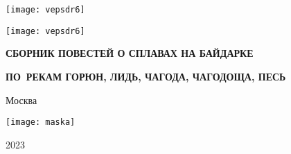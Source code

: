 \begin{titlepage}
	\newpage
	\begin{center}
		\Large \textbf \MyVarAuthorName
	\end{center}	
	\vspace{0.75cm}	
	\begin{center}
	\texttt{[image: vepsdr6]}
	\end{center}	
	\begin{center}
		\Huge{}
	\end{center}	
%
	\begin{center}
	\texttt{[image: vepsdr6]}
	\end{center}
%
	\begin{center}
		\footnotesize
%	
		{
		\textbf{СБОРНИК ПОВЕСТЕЙ О СПЛАВАХ НА БАЙДАРКЕ}}
		
		{
		\textbf{ПО~РЕКАМ ГОРЮН, ЛИДЬ, ЧАГОДА, ЧАГОДОЩА, ПЕСЬ}}		
	\end{center}
%
	\vspace{\fill}	
	\begin{center}\normalsize Москва\end{center}
	\vspace{-1.1cm}
	\begin{center}\texttt{[image: maska]}\end{center}
	\vspace{-1.24cm}
	\begin{center}\normalsize 2023\end{center}	
\end{titlepage}
